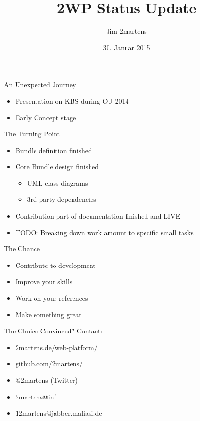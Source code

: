\documentclass{beamer}
\begin{document}
\author{Jim 2martens}
\title{2WP Status Update}
\date{30. Januar 2015}

\begin{frame}
  \titlepage
\end{frame}

\begin{frame}{An Unexpected Journey}
  \begin{itemize}
    \vfill
    \item Presentation on KBS during OU 2014
    \vfill
    \item Early Concept stage
    \vfill
  \end{itemize}
\end{frame}

\begin{frame}{The Turning Point}
  \begin{itemize}
    \vfill
    \item Bundle definition finished
    \vfill
    \item Core Bundle design finished
    \begin{itemize}
      \item UML class diagrams
      \item 3rd party dependencies
    \end{itemize}
    \vfill
    \item Contribution part of documentation finished and LIVE
    \vfill
    \item TODO: Breaking down work amount to specific small tasks
    \vfill
  \end{itemize}
\end{frame}

\begin{frame}{The Chance}
  \begin{itemize}
    \vfill
    \item Contribute to development
    \vfill
    \item Improve your skills
    \vfill
    \item Work on your references
    \vfill
    \item Make something great
    \vfill
  \end{itemize}
\end{frame}

\begin{frame}{The Choice}
  Convinced?
  \vfill
  Contact:
  \begin{itemize}
    \item \url{2martens.de/web-platform/}
    \item \url{github.com/2martens/}
    \item @2martens (Twitter)
    \item 2martens@inf
    \item 12martens@jabber.mafiasi.de
  \end{itemize}
\end{frame}
\end{document}
